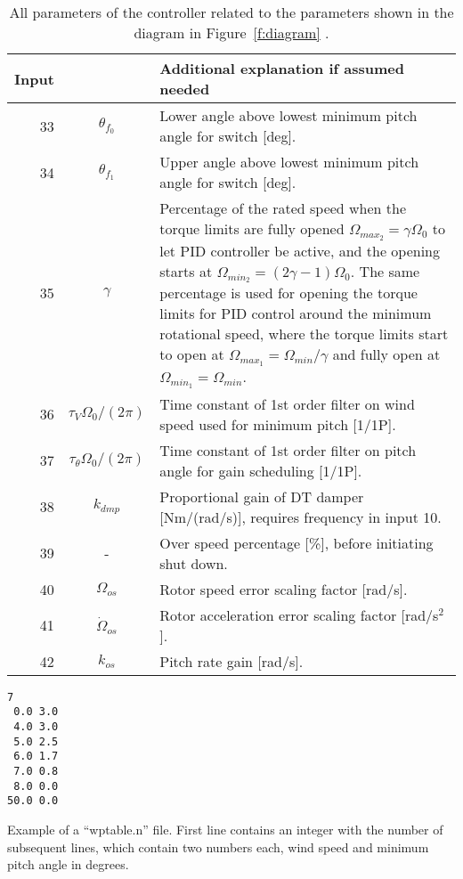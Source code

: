 \begin{table}[t!]
\begin{center}
\begin{tabular}{r|c|p{11.5cm}}
Input &  & Additional explanation if assumed needed \\ \hline
33 & $\theta_{f_0}$ & Lower angle above lowest minimum pitch angle for switch [deg]. \\
34 & $\theta_{f_1}$ & Upper angle above lowest minimum pitch angle for switch [deg]. \\
35 & $\gamma$ & Percentage of the rated speed when the torque limits are fully opened $\Omega_{max_2}=\gamma\Omega_0$ to let PID controller be active, and the opening starts at $\Omega_{min_2}=(2 \gamma -1)\Omega_0$. The same percentage is used for opening the torque limits for PID control around the minimum rotational speed, where the torque limits start to open at $\Omega_{max_1}=\Omega_{min}/\gamma$ and fully open at $\Omega_{min_1}=\Omega_{min}$. \\
36 & $\tau_V \Omega_0 /(2\pi)$ & Time constant of 1st order filter on wind speed used for minimum pitch [1/1P]. \\
37 & $\tau_{\theta} \Omega_0 /(2\pi)$ & Time constant of 1st order filter on pitch angle for gain scheduling [1/1P]. \\
38 & $k_{dmp}$ & Proportional gain of DT damper [Nm/(rad/s)], requires frequency in input 10. \\
\hline
39 & -& Over speed percentage  [\%], before initiating shut down. \\
\hline
40 & $\Omega_{os}$ & Rotor speed error scaling factor  [rad/s]. \\
41 & $\dot{\Omega}_{os}$ & Rotor acceleration error scaling factor  [rad/s${}^2$]. \\
42 & $k_{os}$ & Pitch rate gain  [rad/s].
\end{tabular}
\caption{All parameters of the controller related to the parameters shown in the diagram in Figure~\ref{f:diagram} . \label{t:par}}
\end{center}
\end{table}

\begin{table}[t]
\begin{center}
\begin{verbatim}
7
 0.0 3.0
 4.0 3.0
 5.0 2.5
 6.0 1.7
 7.0 0.8
 8.0 0.0
50.0 0.0
\end{verbatim}
\caption{Example of a ``wptable.n'' file. First line contains an integer with the number of subsequent lines, which contain two numbers each, wind speed and minimum pitch angle in degrees.\label{t:wptable}}
\end{center}
\end{table}


